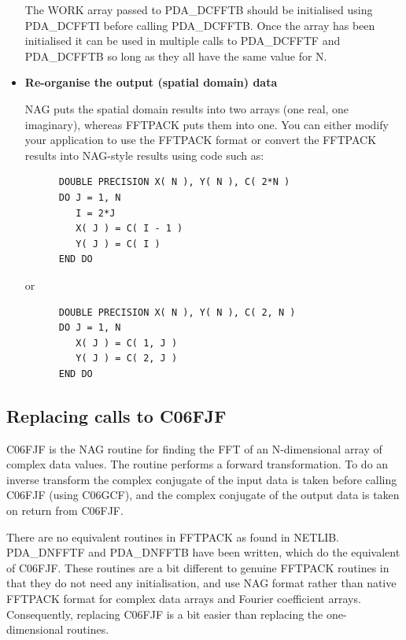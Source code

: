 \documentclass[11pt,twoside]{article}
\newcommand{\xlabel}[1]{}
\begin{document}
\begin{itemize}
   The WORK array passed to PDA\_DCFFTB should be initialised using
   PDA\_DCFFTI before calling PDA\_DCFFTB. Once the array has been
   initialised it can be used in multiple calls to PDA\_DCFFTF and
   PDA\_DCFFTB so long as they all have the same value for N.

\item{\bf Re-organise the output (spatial domain) data}

   NAG puts the spatial domain results into two arrays (one real, one
   imaginary), whereas FFTPACK puts them into one. You can either
   modify your application to use the FFTPACK format or convert the
   FFTPACK results into NAG-style results using code such as:

\begin{verbatim}
      DOUBLE PRECISION X( N ), Y( N ), C( 2*N )
      DO J = 1, N
         I = 2*J
         X( J ) = C( I - 1 )
         Y( J ) = C( I )
      END DO
\end{verbatim}

   or

\begin{verbatim}
      DOUBLE PRECISION X( N ), Y( N ), C( 2, N )
      DO J = 1, N
         X( J ) = C( 1, J )
         Y( J ) = C( 2, J )
      END DO
\end{verbatim}

\end{itemize}


\subsection{\xlabel{replacing_calls_to_c06fjf}\label{m_c06fjf}Replacing calls to C06FJF}

   C06FJF is the NAG routine for finding the FFT of an N-dimensional
   array of complex data values. The routine performs a forward
   transformation. To do an inverse transform the complex conjugate of
   the input data is taken before calling C06FJF (using C06GCF), and the
   complex conjugate of the output data is taken on return from C06FJF.

   There are no equivalent routines in FFTPACK as found in NETLIB.
   PDA\_DNFFTF and PDA\_DNFFTB have been written, which do the equivalent of
   C06FJF. These routines are a bit different to genuine FFTPACK
   routines in that they do not need any initialisation, and use NAG
   format rather than native FFTPACK format for complex data arrays and
   Fourier coefficient arrays. Consequently, replacing C06FJF is a bit
   easier than replacing the one-dimensional routines.
\end{document}
